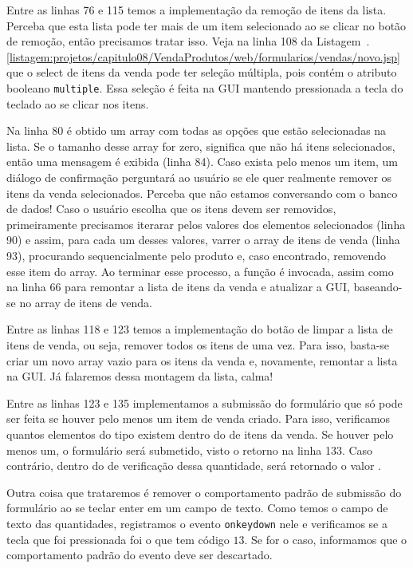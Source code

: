 Entre as linhas 76 e 115 temos a implementação da remoção de itens da lista. Perceba que esta lista pode ter mais de um item selecionado ao se clicar no botão de remoção, então precisamos tratar isso. Veja na linha 108 da Listagem~\thechapter.\ref{listagem:projetos/capitulo08/VendaProdutos/web/formularios/vendas/novo.jsp} que o select de itens da venda pode ter seleção múltipla, pois contém o atributo booleano \texttt{multiple}. Essa seleção é feita na GUI mantendo pressionada a tecla  do teclado ao se clicar nos itens.

Na linha 80 é obtido um array com todas as opções que estão selecionadas na lista. Se o tamanho desse array for zero, significa que não há itens selecionados, então uma mensagem é exibida (linha 84). Caso exista pelo menos um item, um diálogo de confirmação perguntará ao usuário se ele quer realmente remover os itens da venda selecionados. Perceba que não estamos conversando com o banco de dados! Caso o usuário escolha que os itens devem ser removidos, primeiramente precisamos iterarar pelos valores dos elementos selecionados (linha 90) e assim, para cada um desses valores, varrer o array de itens de venda (linha 93), procurando sequencialmente pelo produto e, caso encontrado, removendo esse item do array. Ao terminar esse processo, a função  é invocada, assim como na linha 66 para remontar a lista de itens da venda e atualizar a GUI, baseando-se no array de itens de venda.

Entre as linhas 118 e 123 temos a implementação do botão de limpar a lista de itens de venda, ou seja, remover todos os itens de uma vez. Para isso, basta-se criar um novo array vazio para os itens da venda e, novamente, remontar a lista na GUI. Já falaremos dessa montagem da lista, calma!

Entre as linhas 123 e 135 implementamos a submissão do formulário que só pode ser feita se houver pelo menos um item de venda criado. Para isso, verificamos quantos elementos do tipo  existem dentro do  de itens da venda. Se houver pelo menos um, o formulário será submetido, visto o retorno  na linha 133. Caso contrário, dentro do  de verificação dessa quantidade, será retornado o valor .

Outra coisa que trataremos é remover o comportamento padrão de submissão do formulário ao se teclar enter em um campo de texto. Como temos o campo de texto das quantidades, registramos o evento \texttt{onkeydown} nele e verificamos se a tecla que foi pressionada foi o  que tem código $13$. Se for o caso, informamos que o comportamento padrão do evento deve ser descartado.

